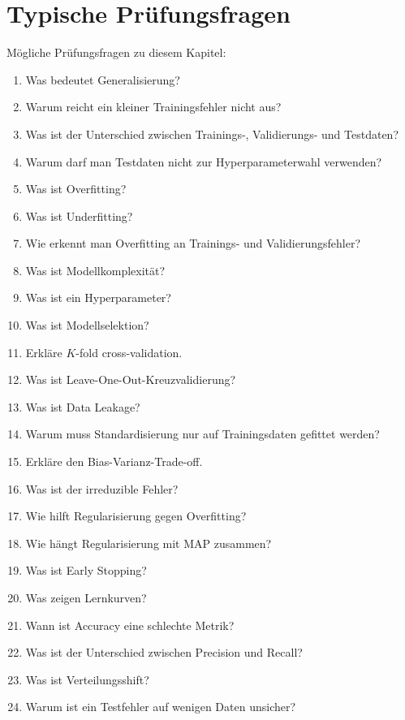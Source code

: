 \section{Typische Prüfungsfragen}

\begin{examtipbox}
Mögliche Prüfungsfragen zu diesem Kapitel:

\begin{enumerate}
    \item Was bedeutet Generalisierung?
    \item Warum reicht ein kleiner Trainingsfehler nicht aus?
    \item Was ist der Unterschied zwischen Trainings-, Validierungs- und Testdaten?
    \item Warum darf man Testdaten nicht zur Hyperparameterwahl verwenden?
    \item Was ist Overfitting?
    \item Was ist Underfitting?
    \item Wie erkennt man Overfitting an Trainings- und Validierungsfehler?
    \item Was ist Modellkomplexität?
    \item Was ist ein Hyperparameter?
    \item Was ist Modellselektion?
    \item Erkläre \(K\)-fold cross-validation.
    \item Was ist Leave-One-Out-Kreuzvalidierung?
    \item Was ist Data Leakage?
    \item Warum muss Standardisierung nur auf Trainingsdaten gefittet werden?
    \item Erkläre den Bias-Varianz-Trade-off.
    \item Was ist der irreduzible Fehler?
    \item Wie hilft Regularisierung gegen Overfitting?
    \item Wie hängt Regularisierung mit MAP zusammen?
    \item Was ist Early Stopping?
    \item Was zeigen Lernkurven?
    \item Wann ist Accuracy eine schlechte Metrik?
    \item Was ist der Unterschied zwischen Precision und Recall?
    \item Was ist Verteilungsshift?
    \item Warum ist ein Testfehler auf wenigen Daten unsicher?
\end{enumerate}
\end{examtipbox}